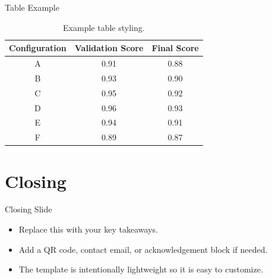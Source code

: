 \documentclass[aspectratio=169]{beamer}
\begin{document}
\begin{frame}{Table Example}
\begin{table}
\centering
\begin{tabular}{c|cc}
Configuration & Validation Score & Final Score \\
\hline
A & 0.91 & 0.88 \\
B & 0.93 & 0.90 \\
C & 0.95 & 0.92 \\
D & 0.96 & 0.93 \\
E & 0.94 & 0.91 \\
F & 0.89 & 0.87
\end{tabular}
\caption{Example table styling.}
\end{table}
\end{frame}

\section{Closing}

\begin{frame}{Closing Slide}
\begin{itemize}
    \item Replace this with your key takeaways.
    \item Add a QR code, contact email, or acknowledgement block if needed.
    \item The template is intentionally lightweight so it is easy to customize.
\end{itemize}
\end{frame}
\end{document}
